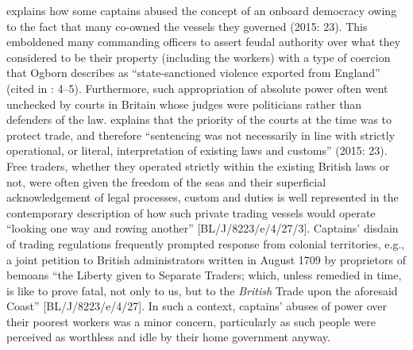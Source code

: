 \citeauthor{Fusaro2015} explains how some captains abused the concept of an onboard democracy owing to the fact that many co-owned the vessels they governed (2015: 23). This emboldened many commanding officers to assert feudal authority over what they considered to be their property (including the workers) with a type of coercion that Ogborn describes as “state-sanctioned violence exported from England” (cited in \citealt{Fury2015}: 4--5). Furthermore, such appropriation of absolute power often went unchecked by courts in Britain whose judges were politicians rather than defenders of the law. \citeauthor{Fusaro2015} explains that the priority of the courts at the time was to protect trade, and therefore “sentencing was not necessarily in line with strictly operational, or literal, interpretation of existing laws and customs” (2015: 23). Free traders, whether they operated strictly within the existing British laws or not, were often given the freedom of the seas and their superficial acknowledgement of legal processes, custom and duties is well represented in the contemporary description of how such private trading vessels would operate “looking one way and rowing another” [BL/J/8223/e/4/27/3]. Captains’ disdain of trading regulations frequently prompted response from colonial territories, e.g., a joint petition to British administrators written in {August 1709} by proprietors of  bemoans “the Liberty given to Separate Traders; which, unless remedied in time, is like to prove fatal, not only to us, but to the \textit{British} Trade upon the aforesaid Coast” [BL/J/8223/e/4/27]. In such a context, captains’ abuses of power over their poorest workers was a minor concern, particularly as such people were perceived as worthless and idle by their home government anyway. 

